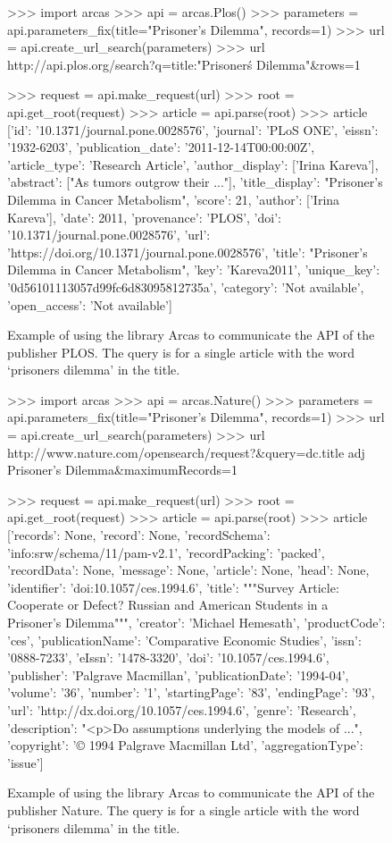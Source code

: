 \begin{figure}[!hbtp]
\begin{usagepy}
>>> import arcas
>>> api = arcas.Plos()
>>> parameters = api.parameters_fix(title="Prisoner's Dilemma", records=1)
>>> url = api.create_url_search(parameters)
>>> url
http://api.plos.org/search?q=title:"Prisoner\'s Dilemma"&rows=1

>>> request = api.make_request(url)
>>> root = api.get_root(request)
>>> article = api.parse(root)
>>> article
[{'id': '10.1371/journal.pone.0028576',
'journal': 'PLoS ONE',
'eissn': '1932-6203',
'publication_date': '2011-12-14T00:00:00Z',
'article_type': 'Research Article',
'author_display': ['Irina Kareva'],
'abstract': ["As tumors outgrow their ..."],
'title_display': "Prisoner's Dilemma in Cancer Metabolism",
'score': 21,
'author': ['Irina Kareva'],
'date': 2011,
'provenance': 'PLOS',
'doi': '10.1371/journal.pone.0028576',
'url': 'https://doi.org/10.1371/journal.pone.0028576',
'title': "Prisoner's Dilemma in Cancer Metabolism",
'key': 'Kareva2011',
'unique_key': '0d56101113057d99fc6d83095812735a',
'category': 'Not available',
'open_access': 'Not available'}]
\end{usagepy}
\caption{Example of using the library Arcas to communicate the API of the publisher
PLOS. The query is for a single article with the word `prisoners dilemma' in
the title.}\label{fig:arcas_query_plos}
\end{figure}

\begin{figure}[!hbtp]
    \begin{usagepy}
>>> import arcas
>>> api = arcas.Nature()
>>> parameters = api.parameters_fix(title="Prisoner's Dilemma", records=1)
>>> url = api.create_url_search(parameters)
>>> url
http://www.nature.com/opensearch/request?&query=dc.title adj Prisoner's Dilemma&maximumRecords=1

>>> request = api.make_request(url)
>>> root = api.get_root(request)
>>> article = api.parse(root)
>>> article
[{'records': None,
'record': None,
'recordSchema': 'info:srw/schema/11/pam-v2.1',
'recordPacking': 'packed',
'recordData': None,
'message': None,
'article': None,
'head': None,
'identifier': 'doi:10.1057/ces.1994.6',
'title': """Survey Article: Cooperate or Defect? Russian and American Students
in a Prisoner's Dilemma""",
'creator': 'Michael Hemesath',
'productCode': 'ces',
'publicationName': 'Comparative Economic Studies',
'issn': '0888-7233',
'eIssn': '1478-3320',
'doi': '10.1057/ces.1994.6',
'publisher': 'Palgrave Macmillan',
'publicationDate': '1994-04',
'volume': '36',
'number': '1',
'startingPage': '83',
'endingPage': '93',
'url': 'http://dx.doi.org/10.1057/ces.1994.6',
'genre': 'Research',
'description': "<p>Do assumptions underlying the models of ...",
'copyright': '© 1994 Palgrave Macmillan Ltd',
'aggregationType': 'issue'}]
    \end{usagepy}
    \caption{Example of using the library Arcas to communicate the API of the publisher
    Nature. The query is for a single article with the word `prisoners dilemma' in
    the title.}\label{fig:arcas_query_nature}
\end{figure}

